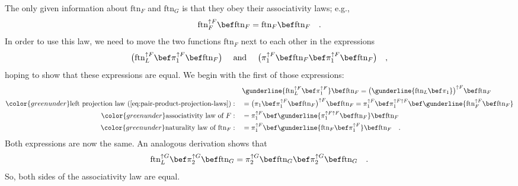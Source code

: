 The only given information about $\text{ftn}_{F}$ and $\text{ftn}_{G}$
is that they obey their associativity laws; e.g.,
\[
\text{ftn}_{F}^{\uparrow F}\bef\text{ftn}_{F}=\text{ftn}_{F}\bef\text{ftn}_{F}\quad.
\]
In order to use this law, we need to move the two functions $\text{ftn}_{F}$
next to each other in the expressions 
\[
\big(\text{ftn}_{L}^{\uparrow F}\bef\pi_{1}^{\uparrow F}\bef\text{ftn}_{F}\big)\quad\text{ and }\quad\big(\pi_{1}^{\uparrow F}\bef\text{ftn}_{F}\bef\pi_{1}^{\uparrow F}\bef\text{ftn}_{F}\big)\quad,
\]
hoping to show that these expressions are equal. We begin with the
first of those expressions:
\begin{align*}
 & \gunderline{\text{ftn}_{L}^{\uparrow F}\bef\pi_{1}^{\uparrow F}}\bef\text{ftn}_{F}=\big(\gunderline{\text{ftn}_{L}\bef\pi_{1}}\big)^{\uparrow F}\bef\text{ftn}_{F}\\
{\color{greenunder}\text{left projection law~(\ref{eq:pair-product-projection-laws})}:}\quad & =\big(\pi_{1}\bef\pi_{1}^{\uparrow F}\bef\text{ftn}_{F}\big)^{\uparrow F}\bef\text{ftn}_{F}=\pi_{1}^{\uparrow F}\bef\pi_{1}^{\uparrow F\uparrow F}\bef\gunderline{\text{ftn}_{F}^{\uparrow F}\bef\text{ftn}_{F}}\\
{\color{greenunder}\text{associativity law of }F:}\quad & =\pi_{1}^{\uparrow F}\bef\gunderline{\pi_{1}^{\uparrow F\uparrow F}\bef\text{ftn}_{F}}\bef\text{ftn}_{F}\\
{\color{greenunder}\text{naturality law of }\text{ftn}_{F}:}\quad & =\pi_{1}^{\uparrow F}\bef\gunderline{\text{ftn}_{F}\bef\pi_{1}^{\uparrow F}}\bef\text{ftn}_{F}\quad.
\end{align*}
Both expressions are now the same. An analogous derivation shows that
\[
\text{ftn}_{L}^{\uparrow G}\bef\pi_{2}^{\uparrow G}\bef\text{ftn}_{G}=\pi_{2}^{\uparrow G}\bef\text{ftn}_{G}\bef\pi_{2}^{\uparrow G}\bef\text{ftn}_{G}\quad.
\]
So, both sides of the associativity law are equal.


